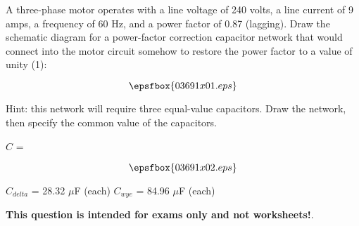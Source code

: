 

A three-phase motor operates with a line voltage of 240 volts, a line current of 9 amps, a frequency of 60 Hz, and a power factor of 0.87 (lagging).  Draw the schematic diagram for a power-factor correction capacitor network that would connect into the motor circuit somehow to restore the power factor to a value of unity (1):

$$\epsfbox{03691x01.eps}$$

Hint: this network will require three equal-value capacitors.  Draw the network, then specify the common value of the capacitors.  

\vskip 10pt

$C$ = 







$$\epsfbox{03691x02.eps}$$

\vskip 10pt

$C_{delta}$ = 28.32 $\mu$F (each) \hskip 150pt $C_{wye}$ = 84.96 $\mu$F (each)







{\bf This question is intended for exams only and not worksheets!}.



